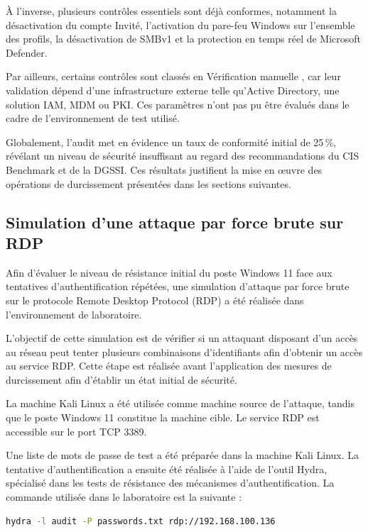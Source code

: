 À l'inverse, plusieurs contrôles essentiels sont déjà conformes, notamment la désactivation du compte Invité, l'activation du pare-feu Windows sur l'ensemble des profils, la désactivation de SMBv1 et la protection en temps réel de Microsoft Defender.

Par ailleurs, certains contrôles sont classés en \og Vérification manuelle \fg{}, car leur validation dépend d'une infrastructure externe telle qu'Active Directory, une solution IAM, MDM ou PKI. Ces paramètres n'ont pas pu être évalués dans le cadre de l'environnement de test utilisé.

Globalement, l'audit met en évidence un taux de conformité initial de 25\,\%, révélant un niveau de sécurité insuffisant au regard des recommandations du CIS Benchmark et de la DGSSI. Ces résultats justifient la mise en œuvre des opérations de durcissement présentées dans les sections suivantes.

\subsection{Simulation d'une attaque par force brute sur RDP}

Afin d'évaluer le niveau de résistance initial du poste Windows 11 face aux tentatives d'authentification répétées, une simulation d'attaque par force brute sur le protocole Remote Desktop Protocol (RDP) a été réalisée dans l'environnement de laboratoire.

L'objectif de cette simulation est de vérifier si un attaquant disposant d'un accès au réseau peut tenter plusieurs combinaisons d'identifiants afin d'obtenir un accès au service RDP. Cette étape est réalisée avant l'application des mesures de durcissement afin d'établir un état initial de sécurité.

La machine Kali Linux a été utilisée comme machine source de l'attaque, tandis que le poste Windows 11 constitue la machine cible. Le service RDP est accessible sur le port TCP 3389.

Une liste de mots de passe de test a été préparée dans la machine Kali Linux. La tentative d'authentification a ensuite été réalisée à l'aide de l'outil Hydra, spécialisé dans les tests de résistance des mécanismes d'authentification. La commande utilisée dans le laboratoire est la suivante :

\begin{lstlisting}[language=bash]
hydra -l audit -P passwords.txt rdp://192.168.100.136
\end{lstlisting}

